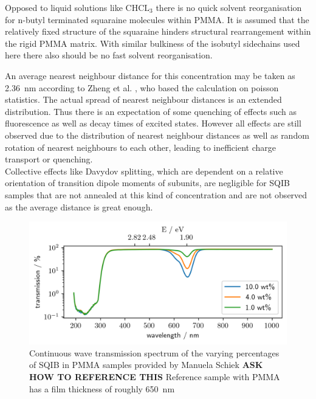\documentclass[twoside,openright]{scrreprt}
\begin{document}
Opposed to liquid solutions like $\mathrm{CHCL_3}$ there is no quick solvent reorganisation for n-butyl terminated squaraine molecules within PMMA. It is assumed that the relatively fixed structure of the squaraine hinders structural rearrangement within the rigid PMMA matrix. With similar bulkiness of the isobutyl sidechains used here there also should be no fast solvent reorganisation. \cite{Zheng2020}

An average nearest neighbour distance for this concentration may be taken as \SI{2.36}{\nano\meter} according to Zheng et al. \cite{Zheng2020}, who based the calculation on poisson statistics\cite{Krider2003}. The actual spread of nearest neighbour distances is an extended distribution. Thus there is an expectation of some quenching of effects such as fluorescence as well as decay times of excited states. However all effects are still observed due to the distribution of nearest neighbour distances as well as random rotation of nearest neighbours to each other, leading to inefficient charge transport or quenching.\cite{Zheng2020} \\
Collective effects like Davydov splitting, which are dependent on a relative orientation of transition dipole moments of subunits, are negligible for SQIB samples that are not annealed at this kind of concentration and are not observed as the average distance is great enough.\\

\begin{figure}[!htp]
\centering
\includegraphics[scale = 1]{images/SQIB_VarPercentInPMMA_transmission.png}
\caption{Continuous wave transmission spectrum of the varying percentages of SQIB in PMMA samples provided by Manuela Schiek\label{fig:VarpercentCWspectrum} \textbf{ASK HOW TO REFERENCE THIS} Reference sample with PMMA has a film thickness of roughly \SI{650}{\nano\meter}}
\end{figure}
\end{document}

